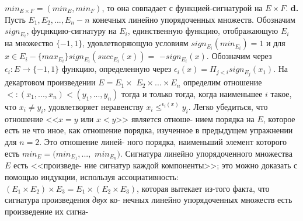 \noindent
$min_{E\times F}=(min_E,min_F)$, то она совпадает с функцией-сигнатурой на\linebreak
$E\times F$.\newline
\hspace*{15pt}\textbf{d.} Пусть $E_1, E_2, ...,E_n - n$ конечных линейно упорядоченных\linebreak
множеств. Обозначим $sign_{E_i}$, фуцнкцию-сигнатуру на $E_i$, единственную\linebreak
функцию, отображающую $E_i$ на множество $\{-1,1\}$, удовлетворяющую\linebreak
условиям $sign_{E_i}(min_{E_i})=1$ и для $x\in E_i-\{max_{E_i}\}sign_{E_i}(succ_{E_i}(x))=$\linebreak
$-sign_{E_i}(x)$. Обозначим через $\epsilon_i:E\rightarrow\{-1,1\}$ функцию, определенную\linebreak
через $\epsilon_i(x)=\Pi_{j<i}sign_{E_j}(x_1)$. На декартовом произведении $E=E_1\times$\linebreak
$E_2\times ... \times E_n$ определим отношение $<: (x_1,...,x_n)<(y_1,...,y_n)$ тогда\linebreak
и только тогда, когда наименьшее $i$ такое, что $x_i\neq y_i$, удовлетворяет\linebreak
неравенству $x_i\leqslant^{\epsilon_i(x)}y_i$.\newline
\hspace*{15pt}Легко убедиться, что отношение <<$x=y$ или $x<y$>> является отноше-\linebreak
нием порядка на $E$, которое есть не что иное, как отношение порядка,\linebreak
изученное в предыдущем упражнении для $n=2$. Это отношение линей-\linebreak
ного порядка, наименьший элемент которого есть $min_E=(min_{E_1},...,$\linebreak
$min_{E_n})$.\newline
\hspace*{15pt}Сигнатура линейно упорядоченного множества $E$ есть  <<произведе-\linebreak
ние  сигнатур  каждой  компоненты>>; это  можно  доказать  с  помощью\linebreak
индукции, используя ассоциативность: $(E_1\times E_2)\times E_3=E_1\times(E_2\times E_3)$,\linebreak
которая вытекает из-того факта, что сигнатура произведения \textit{двух} ко-\linebreak
нечных линейно упорядоченных множеств есть произведение их сигна-\linebreak
